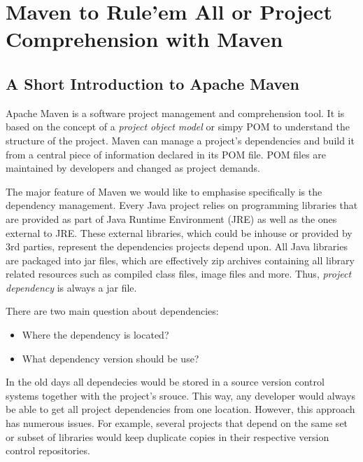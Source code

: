 \chapter{Maven to Rule'em All or Project Comprehension with Maven}\label{ch00:01}



\section{A Short Introduction to Apache Maven}
  
  Apache Maven is a software project management and comprehension tool. 
  It is based on the concept of a \emph{project object model} or simpy POM to understand the structure of the project. 
  Maven can manage a project's dependencies and build it from a central piece of information declared in its POM file.
  POM files are maintained by developers and changed as project demands.

  The major feature of Maven we would like to emphasise specifically is the dependency management.
  Every Java project relies on programming libraries that are provided as part of Java Runtime Environment (JRE) as well as the ones external to JRE.
  These external libraries, which could be inhouse or provided by 3rd parties, represent the dependencies projects depend upon.
  All Java libraries are packaged into jar files, which are effectively zip archives containing all library related resources such as compiled class files, image files and more.
  Thus, \emph{project dependency} is always a jar file.

  There are two main question about dependencies: 
  \begin{itemize}
    \item Where the dependency is located?
    \item What dependency version should be use?
  \end{itemize}

  In the old days all dependecies would be stored in a source version control systems together with the project's srouce.
  This way, any developer would always be able to get all project dependencies from one location.
  However, this approach has numerous issues.
  For example, several projects that depend on the same set or subset of libraries would keep duplicate copies in their respective version control repositories.

